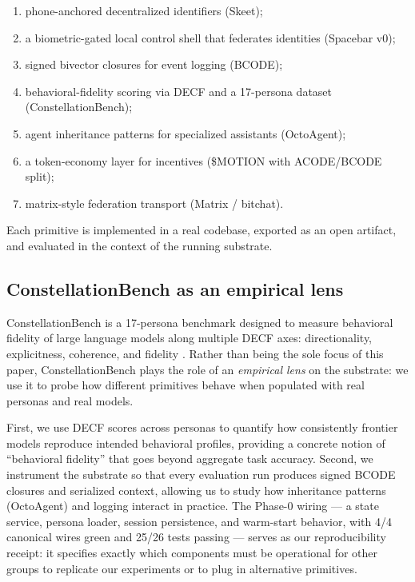 \documentclass{article}
\providecommand{\tightlist}{\setlength{\itemsep}{0pt}\setlength{\parskip}{0pt}}
\begin{document}
\begin{enumerate}
\def\labelenumi{\arabic{enumi}.}
\tightlist
\item
  phone-anchored decentralized identifiers (Skeet);
\item
  a biometric-gated local control shell that federates identities
  (Spacebar v0);
\item
  signed bivector closures for event logging (BCODE);
\item
  behavioral-fidelity scoring via DECF and a 17-persona dataset
  (ConstellationBench);
\item
  agent inheritance patterns for specialized assistants (OctoAgent);
\item
  a token-economy layer for incentives (\$MOTION with ACODE/BCODE
  split);
\item
  matrix-style federation transport (Matrix / bitchat).
\end{enumerate}

Each primitive is implemented in a real codebase, exported as an open
artifact, and evaluated in the context of the running substrate.

\subsection{ConstellationBench as an empirical
lens}\label{constellationbench-as-an-empirical-lens}

ConstellationBench is a 17-persona benchmark designed to measure
behavioral fidelity of large language models along multiple DECF axes:
directionality, explicitness, coherence, and fidelity
\citep{constellationbench2026}. Rather than being the sole focus of this
paper, ConstellationBench plays the role of an \emph{empirical lens} on
the substrate: we use it to probe how different primitives behave when
populated with real personas and real models.

First, we use DECF scores across personas to quantify how consistently
frontier models reproduce intended behavioral profiles, providing a
concrete notion of ``behavioral fidelity'' that goes beyond aggregate
task accuracy. Second, we instrument the substrate so that every
evaluation run produces signed BCODE closures and serialized context,
allowing us to study how inheritance patterns (OctoAgent) and logging
interact in practice. The Phase-0 wiring --- a state service, persona
loader, session persistence, and warm-start behavior, with 4/4 canonical
wires green and 25/26 tests passing --- serves as our reproducibility
receipt: it specifies exactly which components must be operational for
other groups to replicate our experiments or to plug in alternative
primitives.
\end{document}
